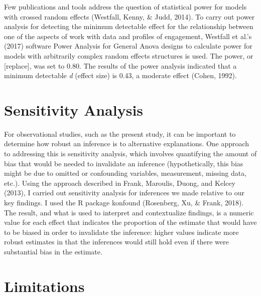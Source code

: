 \documentclass[]{book}
\theoremstyle{definition}
\theoremstyle{definition}
\theoremstyle{definition}
\theoremstyle{remark}
\begin{document}
Few publications and tools address the question of statistical power for
models with crossed random effects (Westfall, Kenny, \& Judd, 2014). To
carry out power analysis for detecting the minimum detectable effect for
the relationship between one of the aspects of work with data and
profiles of engagement, Westfall et al.'s (2017) software Power Analysis
for General Anova designs to calculate power for models with arbitrarily
complex random effects structures is used. The power, or {[}replace{]},
was set to 0.80. The results of the power analysis indicated that a
minimum detectable \emph{d} (effect size) is 0.43, a moderate effect
(Cohen, 1992).

\section{Sensitivity Analysis}\label{sensitivity-analysis}

For observational studies, such as the present study, it can be
important to determine how robust an inference is to alternative
explanations. One approach to addressing this is sensitivity analysis,
which involves quantifying the amount of bias that would be needed to
invalidate an inference (hypothetically, this bias might be due to
omitted or confounding variables, measurement, missing data, etc.).
Using the approach described in Frank, Maroulis, Duong, and Kelcey
(2013), I carried out sensitivity analysis for inferences we made
relative to our key findings. I used the R package konfound (Rosenberg,
Xu, \& Frank, 2018). The result, and what is used to interpret and
contextualize findings, is a numeric value for each effect that
indicates the proportion of the estimate that would have to be biased in
order to invalidate the inference: higher values indicate more robust
estimates in that the inferences would still hold even if there were
substantial bias in the estimate.

\section{Limitations}\label{limitations}
\end{document}
